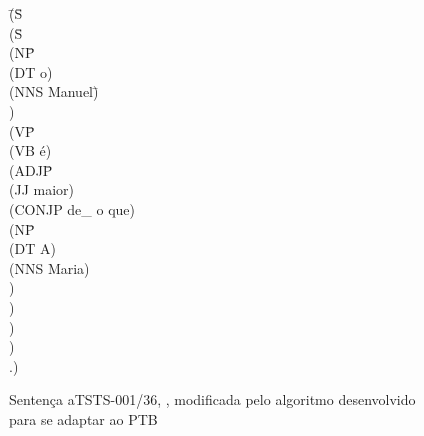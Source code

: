 \begin{figure}[!ht]
    \centering
    \begin{minipage}{10cm}
        \begin{tabbing}
            \=(S\=\+\\ 
            \>  (S\=\+\\ 
            \>    (NP\=\+\\ 
            \>      (DT o)\\
            \>      (NNS Manuel)\=\-\-\\
            \>    )\\
            \>    (VP\=\+\\ 
            \>      (VB é)\\
            \>      (ADJP\=\+\\ 
            \>        (JJ maior)\\
            \>        (CONJP de\_ o que)\\
            \>        (NP\=\+\\ 
            \>          (DT A)\\
            \>          (NNS Maria)\-\\
            \>        )\-\\
            \>      )\-\\
            \>    )\-\\
            \>  )\\
            \>  .)\\
        \end{tabbing}
    \end{minipage}
    \caption[Sentença aTSTS-001/36, modificada para se adaptar ao PTB]{Sentença aTSTS-001/36, , modificada pelo algoritmo desenvolvido para se adaptar ao PTB}
    \label{fig:cintil_conj_exe_2}
\end{figure}